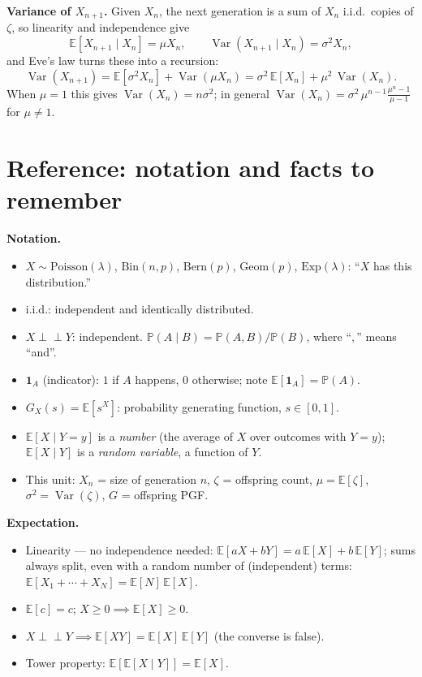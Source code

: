 \documentclass[11pt]{article}
\newcommand{\E}{\mathbb{E}}
\newcommand{\Prob}{\mathbb{P}}
\newcommand{\1}{\mathbf{1}}
\newcommand{\given}{\;\big\vert\;}
\newcommand{\indep}{\perp\!\!\!\perp}
\DeclareMathOperator{\Var}{Var}
\theoremstyle{notestyle}
\theoremstyle{definition}
\begin{document}
\par \textbf{Variance of $X_{n+1}$.} Given $X_n$, the next generation is a sum of
$X_n$ i.i.d.\ copies of $\zeta$, so linearity and independence give
$$\E[X_{n+1} \given X_n] = \mu X_n, \qquad \Var(X_{n+1} \given X_n) = \sigma^2 X_n,$$
and Eve's law turns these into a recursion:
$$\Var(X_{n+1}) = \E[\sigma^2 X_n] + \Var(\mu X_n)
= \sigma^2\, \E[X_n] + \mu^2\, \Var(X_n).$$
When $\mu = 1$ this gives $\Var(X_n) = n\sigma^2$; in general
$\Var(X_n) = \sigma^2\, \mu^{n-1} \frac{\mu^n - 1}{\mu - 1}$ for $\mu \ne 1$.

\section{Reference: notation and facts to remember}
\par \textbf{Notation.}
\begin{itemize}
    \item $X \sim \text{Poisson}(\lambda)$, $\text{Bin}(n,p)$, $\text{Bern}(p)$,
    $\text{Geom}(p)$, $\text{Exp}(\lambda)$: ``$X$ has this distribution.''
    \item i.i.d.: independent and identically distributed.
    \item $X \indep Y$: independent. $\Prob(A \given B) = \Prob(A, B)/\Prob(B)$,
    where ``$,$'' means ``and''.
    \item $\1_A$ (indicator): $1$ if $A$ happens, $0$ otherwise; note
    $\E[\1_A] = \Prob(A)$.
    \item $G_X(s) = \E[s^X]$: probability generating function, $s \in [0,1]$.
    \item $\E[X \given Y{=}y]$ is a \emph{number} (the average of $X$ over outcomes
    with $Y = y$); $\E[X \given Y]$ is a \emph{random variable}, a function of $Y$.
    \item This unit: $X_n$ = size of generation $n$, $\zeta$ = offspring count,
    $\mu = \E[\zeta]$, $\sigma^2 = \Var(\zeta)$, $G$ = offspring PGF.
\end{itemize}
\par \textbf{Expectation.}
\begin{itemize}
    \item Linearity --- no independence needed:
    $\E[aX + bY] = a\,\E[X] + b\,\E[Y]$; sums always split, even with a random number
    of (independent) terms: $\E[X_1 + \cdots + X_N] = \E[N]\,\E[X]$.
    \item $\E[c] = c$; $X \ge 0 \implies \E[X] \ge 0$.
    \item $X \indep Y \implies \E[XY] = \E[X]\,\E[Y]$ (the converse is false).
    \item Tower property: $\E[\E[X \given Y]] = \E[X]$.
\end{itemize}
\end{document}

